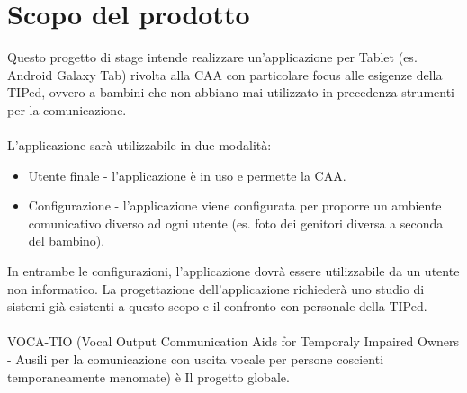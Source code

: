 \section{Scopo del prodotto}
Questo progetto di stage intende realizzare un'applicazione per Tablet (es.
Android Galaxy Tab) rivolta alla CAA con particolare focus alle esigenze della
TIPed, ovvero a bambini che non abbiano mai utilizzato in precedenza strumenti
per la comunicazione. \\\\
L'applicazione sarà utilizzabile in due modalità: 
\begin{itemize}
  \item Utente finale - l'applicazione è in uso e permette la CAA.
  \item Configurazione - l'applicazione viene configurata per proporre un
  ambiente comunicativo diverso ad ogni utente (es. foto dei genitori diversa a
  seconda del bambino).
\end{itemize}
In entrambe le configurazioni, l'applicazione dovrà essere utilizzabile da un
utente non informatico. La progettazione dell'applicazione richiederà uno studio
di sistemi già esistenti a questo scopo e il confronto con personale della
TIPed.\\\\
VOCA-TIO (Vocal Output Communication Aids for Temporaly Impaired Owners -
Ausili per la comunicazione con uscita vocale per persone coscienti
temporaneamente menomate) è Il progetto globale.


